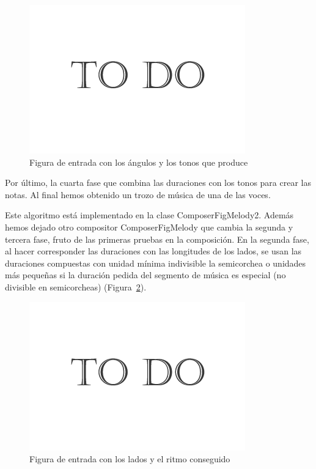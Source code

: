 		\begin{figure}[htbp]
		\centering
		\hspace*{0.0in}
		\includegraphics[scale=0.57]{graphics/todo.png}
		\caption{Figura de entrada con los ángulos y los tonos que produce}
		\label{fig:Figura4Voz1}
		\end{figure}

Por último, la cuarta fase que combina las duraciones con los tonos para crear las notas. Al final hemos obtenido un trozo de música de una de las voces.

Este algoritmo está implementado en la clase ComposerFigMelody2. Además hemos dejado otro compositor ComposerFigMelody que cambia la segunda y tercera fase, fruto de las primeras pruebas en la composición. En la segunda fase, al hacer corresponder las duraciones con las longitudes de los lados, se usan las duraciones compuestas con unidad mínima indivisible la semicorchea o unidades más pequeñas si la duración pedida del segmento de música es especial (no divisible en semicorcheas) (Figura~\ref{fig:Figura5Voz1}).

		\begin{figure}[htbp]
		\centering
		\hspace*{0.0in}
		\includegraphics[scale=0.57]{graphics/todo.png}
		\caption{Figura de entrada con los lados y el ritmo conseguido}
		\label{fig:Figura5Voz1}
		\end{figure}

